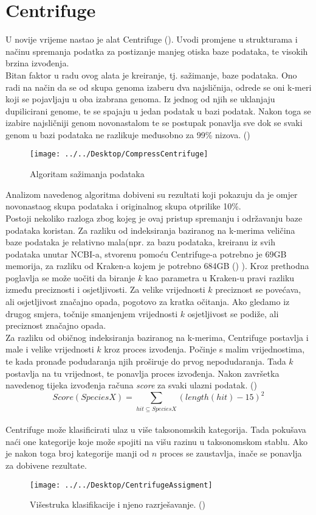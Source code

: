 \documentclass[times, utf8, seminar]{fer}
\begin{document}
\section{Centrifuge}
U novije vrijeme nastao je alat Centrifuge (\cite{Centrifuge}). Uvodi promjene u strukturama i načinu spremanja podatka za postizanje manjeg otiska baze podataka, te visokih brzina izvođenja.
\\Bitan faktor u radu ovog alata je kreiranje, tj. sažimanje, baze podataka. Ono radi na način da se od skupa genoma izaberu dva najsličnija, odrede se oni k-meri koji se pojavljaju u oba izabrana genoma. Iz jednog od njih se uklanjaju dupilicirani genome, te se spajaju u jedan podatak u bazi podatak. Nakon toga se izabire najsličniji genom novonastalom te se postupak ponavlja sve dok se svaki genom u bazi podataka ne razlikuje međusobno za 99\% nizova. (\cite{Centrifuge})
\begin{figure}
	\centering
	\texttt{[image: ../../Desktop/CompressCentrifuge]}
	\caption{Algoritam sažimanja podataka}
	\label{fig:compresscentrifuge}
\end{figure}
Analizom navedenog algoritma dobiveni su rezultati koji pokazuju da je omjer novonastaog skupa podataka i originalnog skupa otprilike 10\%.
\\Postoji nekoliko razloga zbog kojeg je ovaj pristup spremanju i održavanju baze podataka koristan. Za razliku od indeksiranja baziranog na k-merima veličina baze podataka je relativno mala(npr. za bazu podataka, kreiranu iz svih podataka unutar NCBI-a, stvorenu pomoću Centrifuge-a potrebno je 69GB memorija, za razliku od Kraken-a kojem je potrebno 684GB (\cite{Centrifuge}) ). Kroz prethodna poglavlja se može uočiti da biranje ${k}$ kao parametra u Kraken-u pravi razliku između preciznosti i osjetljivosti. Za velike vrijednosti $k$ preciznost se povećava, ali osjetljivost značajno opada, pogotovo za kratka očitanja. Ako gledamo iz drugog smjera, točnije smanjenjem vrijednosti $k$ osjetljivost se podiže, ali preciznost značajno opada.
\\Za razliku od običnog indeksiranja baziranog na k-merima, Centrifuge postavlja i male i velike vrijednosti $k$ kroz proces izvođenja. Počinje s malim vrijednostima, te kada pronađe podudaranja njih proširuje do prvog nepodudaranja. Tada $k$ postavlja na tu vrijednost, te ponavlja proces izvođenja. Nakon završetka navedenog tijeka izvođenja računa \textit{score} za svaki ulazni podatak. (\cite{Centrifuge})
$$Score(Species X) = \sum_{hit\subseteq Species X} (length(hit) - 15)^2$$
\\Centrifuge može klasificirati ulaz u više taksonomskih kategorija. Tada pokušava naći one kategorije koje može spojiti na višu razinu u taksonomskom stablu. Ako je nakon toga broj kategorije manji od $n$ proces se zaustavlja, inače se ponavlja za dobivene rezultate.
\begin{figure}
	\centering
	\texttt{[image: ../../Desktop/CentrifugeAssigment]}
	\caption{Višestruka klasifikacije i njeno razrješavanje. (\cite{Centrifuge})}
	\label{fig:centrifugeassigment}
\end{figure}
\end{document}
